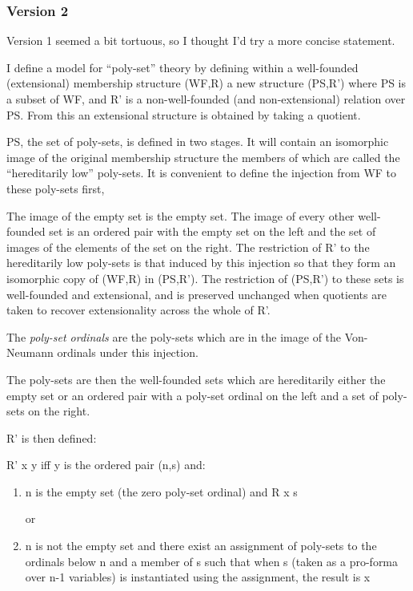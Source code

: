 \documentclass[numreferences]{rbjk}
\begin{document}
\begin{article}
\subsubsection{Version 2}

Version 1 seemed a bit tortuous, so I thought I'd try a more concise statement.

I define a model for ``poly-set'' theory by defining within a well-founded (extensional) membership structure \textsf{(WF,R)} a new structure \textsf{(PS,R')} where \textsf{PS} is a subset of \textsf{WF}, and \textsf{R'} is a non-well-founded (and non-extensional) relation over \textsf{PS}. From this an extensional structure is obtained by taking a quotient.

\textsf{PS}, the set of poly-sets, is defined in two stages.
It will contain an isomorphic image of the original membership structure the members of which are called the ``hereditarily low'' poly-sets.
It is convenient to define the injection from \textsf{WF} to these poly-sets first,

The image of the empty set is the empty set.
The image of every other well-founded set is an ordered pair with the empty set on the left and the set of images of the elements of the set on the right.
The restriction of \textsf{R'} to the hereditarily low poly-sets is that induced by this injection so that they form an isomorphic copy of \textsf{(WF,R)} in \textsf{(PS,R')}.
The restriction of \textsf{(PS,R')} to these sets is well-founded and extensional, and is preserved unchanged when quotients are taken to recover extensionality across the whole of \textsf{R'}.

The \emph{poly-set ordinals} are the poly-sets which are in the image of the Von-Neumann ordinals under this injection.

The poly-sets are then the well-founded sets which are hereditarily either the empty set or an ordered pair with a poly-set ordinal on the left and a set of poly-sets on the right.

\textsf{R'} is then defined:

\textsf{R' x y} iff y is the ordered pair \textsf{(n,s)} and:

\begin{enumerate}
\item n is the empty set (the zero poly-set ordinal) and \textsf{R x s} 

or
\item n is not the empty set and there exist an assignment of poly-sets to the ordinals below n and a member of s such that when s (taken as a pro-forma over n-1 variables) is instantiated using the assignment, the result is x 
\end{enumerate}


\end{article}
\end{document}
